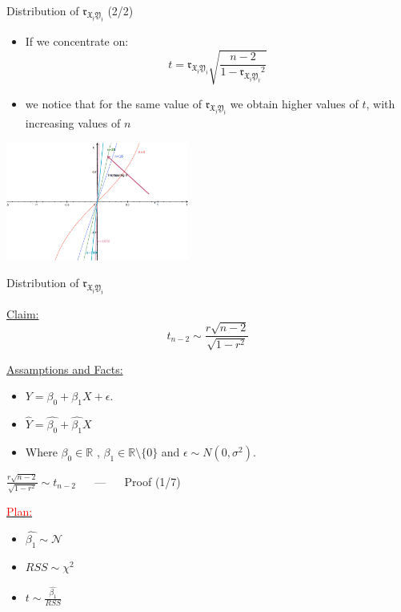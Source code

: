 \documentclass{beamer}
\begin{document}
\begin{frame}
{\centerline{Distribution of $\mathfrak{r_{X_jY_j}}$ (2/2) }}

\begin{itemize}
\item If we concentrate on:
$$t = \mathfrak{r_{X_jY_j}}\sqrt{\frac{n-2}{1-\mathfrak{r_{X_jY_j}}^2}}$$
\item we notice that for the same value of $\mathfrak{r_{X_jY_j}}$ we obtain higher values of $t$, with increasing values of $n$
\end{itemize}
\begin{center}
\includegraphics[width=6cm]{P2023.AIBCCSS.InferenceAndLogisticRegression/StudentTCorrelation.jpg}
\end{center} 

\end{frame}

\begin{frame}
{\centerline{Distribution of $\mathfrak{r_{X_jY_j}}$ }}

\underline{Claim:} \\
$$t_{n-2} \sim \frac{r\sqrt{n-2}}{\sqrt{1-r^2}}$$

\underline{Assamptions and Facts:} \\
\vspace*{2mm}
\begin{itemize}
\item $ Y = \beta_0 + \beta_1 X + \epsilon $. 

\item $\hat{Y} = \hat{\beta_0} + \hat{\beta_1} X$

\item Where $\beta_0 \in \mathbb{R}$ , $\beta_1 \in \mathbb{R} \setminus \{0\}$ and $\epsilon \sim N(0, \sigma^2)$. 
\end{itemize}

\vspace*{2.5mm}

\end{frame}


\begin{frame}
{\centerline{$ \frac{r\sqrt{n-2}}{\sqrt{1-r^2}} \sim t_{n-2}  $  ~~ --- ~~ Proof (1/7)}}

\underline{\textcolor{red}{Plan:}}
\begin{itemize}
\setlength\itemsep{0.8em}
\item $\hat{\beta_1} \sim \mathcal{N}$
\item $RSS \sim \chi^2$
\item $t \sim \frac{\hat{\beta_1}}{RSS}$
\end{itemize}



\end{frame}
\end{document}
